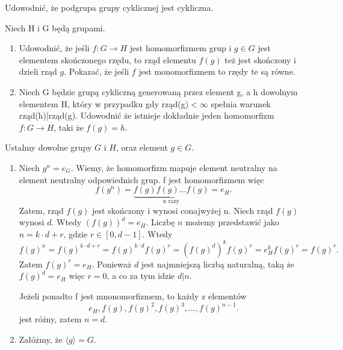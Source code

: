 \begin{solution}

	
\end{solution}
\begin{problem}[9]

	Udowodnić, że podgrupa grupy cyklicznej jest cykliczna.
\end{problem}
\begin{problem}[10]

	Niech H i G będą grupami.


	\begin{enumerate}[label=\alph*)]
		\item Udowodnić, że jeśli $f:G\rightarrow H$ jest homomorfizmem grup i $g\in G$ jest elementem skończonego rzędu, to rząd elementu $f(g)$ też jest skończony i dzieli rząd $g$. Pokazać, że jeśli $f$ jest monomorfizmem to rzędy te są równe. 
		\item Niech G będzie grupą cykliczną generowaną przez element g, a h dowolnym elementem H, który w przypadku gdy rząd(g)$<\infty$ spełnia warunek rząd(h)|rząd(g). Udowodnić że istnieje dokładnie jeden homomorfizm $f:G\rightarrow H$, taki że $f(g) = h$.
	\end{enumerate}
\end{problem}
\begin{solution}
	Ustalmy dowolne grupy $G$ i $H$, oraz element  $g\in G$.
	\begin{enumerate}[label=\alph*)]
		\item Niech $g^{n} = e_G$. Wiemy, że homomorfizm mapuje element neutralny na element neutralny odpowiednich grup. f jest homomorfizmem więc
			\[
				f(g^{n}) = \underbrace{f(g)f(g)\ldots f(g)}_{\text{n razy}}= e_H
			.\] 
			Zatem, rząd $f(g)$ jest skończony i wynosi conajwyżej n. 
			Niech rząd $f(g)$ wynosi $d$. Wtedy $\left( f(g) \right) ^{d} = e_H$. Liczbę $n$ możemy przedstawić jako  $n = k\cdot d + r$, gdzie $r \in [0, d-1]$. Wtedy \[
	f(g)^{n} = f(g)^{k\cdot d +r} =f(g)^{k\cdot d}f(g)^{r} = \left( f(g)^{d} \right)^{k}f(g)^{r} = e_H^{k}f(g)^{r} = f(g)^{r}
			.\] 
			Zatem $f(g)^{r} = e_H$. Ponieważ $d$ jest najmniejszą liczbą naturalną, taką że $f(g)^{d}=e_H$ więc $r = 0$, a co za tym idzie $d|n$.  

			Jeżeli ponadto f jest mnonomorfizmem, to każdy z elementów
			\[
			e_H, f(g), f(g)^{2}, f(g)^{3},\ldots, f(g)^{n-1}
			.\] 
			jest różny, zatem $n = d$. 
		\item Załóżmy, że  $\langle g \rangle = G$. 
	\end{enumerate}

	
\end{solution}
